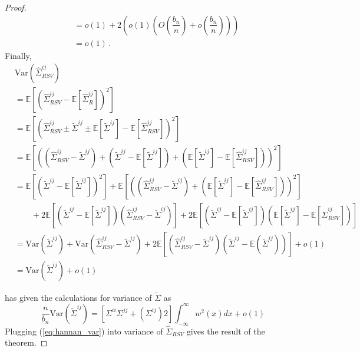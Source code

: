 \documentclass[11pt]{article}
\newcommand{\E}{\mathbb{E}}
\newcommand{\Var}{\text{Var}}
\theoremstyle{remark}
\begin{document}
\begin{proof}
\begin{align*}
& = o(1) + 2\left(o(1) \left(O\left( \dfrac{b_n}{n}\right)  + o\left( \dfrac{b_n}{n}\right) \right)  \right) \\ 
& = o(1)\,.
\end{align*}
%
Finally,
\begin{align*}
 & \Var\left(\hat{\Sigma}_{RSV}^{ij} \right)\\
  & = \E \left[ \left(\hat{\Sigma}_{RSV}^{ij}  - \E \left[\hat{\Sigma}_{R}^{ij}  \right] \right)^2 \right]\\
& = \E \left[ \left(\hat{\Sigma}_{RSV}^{ij} \pm \tilde{\Sigma}^{ij} \pm \E \left[ \tilde{\Sigma}^{ij}\right] - \E \left[\hat{\Sigma}_{RSV}^{ij}  \right] \right)^2 \right]\\
& = \E\left[ \left( \left(\hat{\Sigma}_{RSV}^{ij} - \tilde{\Sigma}^{ij} \right) + \left(\tilde{\Sigma}^{ij}  - \E\left[\tilde{\Sigma}^{ij}\right]\right) + \left(\E\left[\tilde{\Sigma}^{ij}\right] - \E \left[\hat{\Sigma}_{RSV}^{ij}  \right] \right)  \right)^2 \right] \\ 
& =  \E\left[ \left(\tilde{\Sigma}^{ij}  - \E\left[\tilde{\Sigma}^{ij}\right]\right)^2 \right] + \E \left[ \left(\left(\hat{\Sigma}_{RSV}^{ij} - \tilde{\Sigma}^{ij} \right) + \left(\E\left[\tilde{\Sigma}^{ij}\right] - \E \left[\hat{\Sigma}_{RSV}^{ij}  \right] \right) \right)^2 \right] \\
& \quad \quad + 2\E\left[\left(\tilde{\Sigma}^{ij}  - \E\left[\tilde{\Sigma}^{ij}\right]\right) \left(\hat{\Sigma}_{RSV}^{ij} - \tilde{\Sigma}^{ij} \right)\right] + 2 \E\left[\left(\tilde{\Sigma}^{ij}  - \E\left[\tilde{\Sigma}^{ij}\right]\right) \left(\E \left[\tilde{\Sigma}^{ij}\right] - \E \left[\hat{\Sigma}_{RSV}^{ij}  \right] \right)\right]\\
& = \Var\left( \tilde{\Sigma}^{ij}\right) + \Var\left(\hat{\Sigma}_{RSV}^{ij} - \tilde{\Sigma}^{ij} \right) + 2 \E\left[ \left(\hat{\Sigma}_{RSV}^{ij} -  \tilde{\Sigma}^{ij} \right) \left(\tilde{\Sigma}^{ij}  - \E \left( \tilde{\Sigma}^{ij} \right) \right) \right] + o(1)\\
& = \Var\left( \tilde{\Sigma}^{ij}\right) + o(1)
\end{align*}

\cite{hannan2009multiple} has given the calculations for variance of $\tilde{\Sigma}$ as 
\begin{equation} \label{eq:hannan_var}
\dfrac{n}{b_n}\Var(\tilde{\Sigma}^{ij}) = [\Sigma^{ii}\Sigma^{jj} + \left(\Sigma^{ij} \right)2]\int_{-\infty}^{\infty}w^2(x)dx + o(1)    
\end{equation}
Plugging (\ref{eq:hannan_var}) into variance of $\hat{\Sigma}_{RSV}$ gives the result of the theorem.
 
\end{proof}

\singlespacing


\end{document}
